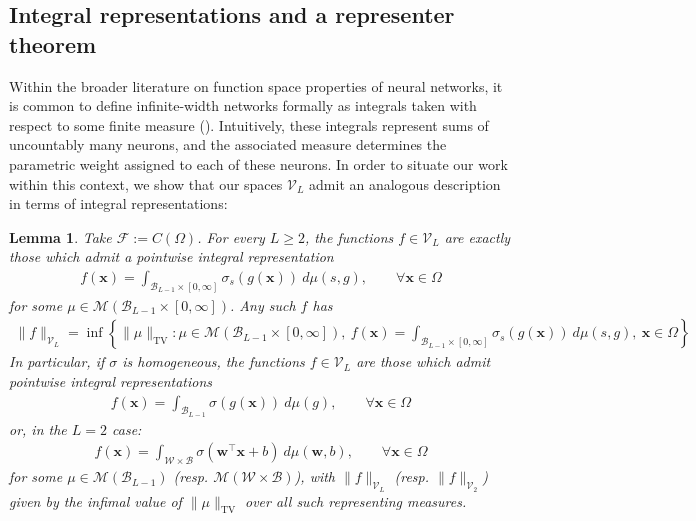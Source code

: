 \documentclass{article}
\DeclareMathOperator{\TV}{TV}
\def\vw{{\bm{w}}}
\def\vx{{\bm{x}}}
\def\cB{{\mathcal{B}}}
\def\cF{{\mathcal{F}}}
\def\cM{{\mathcal{M}}}
\def\cV{{\mathcal{V}}}
\def\cW{{\mathcal{W}}}
\newtheorem{lemma}[theorem]{Lemma}
\begin{document}
\subsection{Integral representations and a representer theorem} \label{sec:int_rep_thm}

Within the broader literature on function space properties of neural networks, it is common to define infinite-width networks formally as integrals taken with respect to some finite measure (\cite{bach2017breaking,savarese2019infinite,ongie2019function,shenouda2024variation,bartolucci2023understanding}). Intuitively, these integrals represent sums of uncountably many neurons, and the associated measure determines the parametric weight assigned to each of these neurons. In order to situate our work within this context, we show that our spaces $\cV_L$ admit an analogous description in terms of integral representations:



\begin{lemma} \label{lemma:integral_rep}
    Take $\cF := C(\Omega)$. For every $L \geq 2$, the functions $f \in \cV_L$ are exactly those which admit a pointwise integral representation
    \begin{align} \label{eq:pointwise_integral_rep}
        f(\vx) = \int_{\cB_{L-1} \times [0,\infty]} \sigma_s(g(\vx)) \ d \mu(s,g), \qquad \forall \vx \in \Omega
    \end{align}
    for some $\mu \in \cM(\cB_{L-1} \times [0,\infty])$. Any such $f$ has
    \begin{align} 
        \| f \|_{\cV_L} = \inf \left\{ \| \mu \|_{\TV}: \mu \in \cM(\cB_{L-1} \times [0,\infty]), \  f(\vx) = \int_{\cB_{L-1} \times [0,\infty]} \sigma_s (g(\vx)) \ d \mu(s,g), \  \vx \in \Omega \right\}
    \end{align}
    In particular, if $\sigma$ is homogeneous, the functions $f \in \cV_L$ are those which admit pointwise integral representations
    \begin{align} \label{eq:pointwise_integral_rep_homogeneous}
        f(\vx) = \int_{\cB_{L-1}} \sigma(g(\vx)) \ d \mu(g), \qquad \forall \vx \in \Omega
    \end{align}
    or, in the $L=2$ case:
    \begin{align} \label{eq:pointwise_integral_rep_homogeneous_shallow}
        f(\vx) = \int_{\cW \times \cB} \sigma(\vw^\top \vx + b) \ d \mu(\vw,b), \qquad \forall \vx \in \Omega
    \end{align}
    for some $\mu \in \cM(\cB_{L-1})$ (resp. $\cM(\cW \times \cB)$), with $\| f \|_{\cV_L}$ (resp. $\| f \|_{\cV_2}$) given by the infimal value of $\| \mu \|_{\TV}$ over all such representing measures.
\end{lemma}
\end{document}

